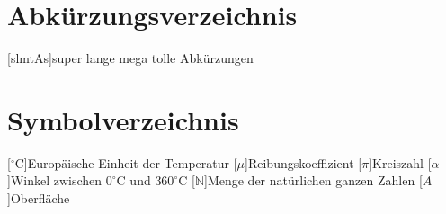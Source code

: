 \newcommand{\acrosecondcolumn}[1]{\acroextra{\makebox[21mm][l]{#1}}}

\chapter*{Abkürzungsverzeichnis}\thispagestyle{rmplain}
\label{sec:abkuerzungsverzeichnis}
\begin{acronym}[LONGEST]
	[slmtAs]{super lange mega tolle Abkürzungen} %
\end{acronym}


\chapter*{Symbolverzeichnis}\thispagestyle{rmplain}
\label{sec:symbolverzeichnis}
\begin{acronym}[LONGEST]
	[$^\circ\text{C}$]{Europäische Einheit der Temperatur}
	[$\mu$]{Reibungskoeffizient}
	[$\pi$]{Kreiszahl}
	[$\alpha$]{Winkel zwischen $0^\circ\text{C}$ und $360^\circ\text{C}$}
	[$\mathbb{N}$]{Menge der natürlichen ganzen Zahlen}
	[\ensuremath{A}]{Oberfläche}
\end{acronym}